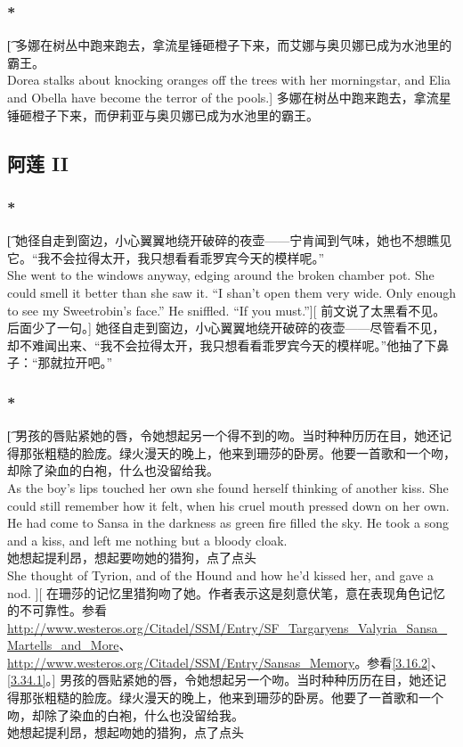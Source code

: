 \documentclass[12pt,a4paper]{article}
\begin{document}
\subsubsection{\color{red}*}\t[
	多娜在树丛中跑来跑去，拿流星锤砸橙子下来，而艾娜与奥贝娜已成为水池里的霸王。\\
	Dorea stalks about knocking oranges off the trees with her morningstar, and Elia and Obella have become the terror of the pools.]
	多娜在树丛中跑来跑去，拿流星锤砸橙子下来，而伊莉亚与奥贝娜已成为水池里的霸王。
	
\subsection{阿莲 II}
\subsubsection{\color{red}*}\t[
	她径自走到窗边，小心翼翼地绕开破碎的夜壶——宁肯闻到气味，她也不想瞧见它。“我不会拉得太开，我只想看看乖罗宾今天的模样呢。”\\
	She went to the windows anyway, edging around the broken chamber pot. She could smell it better than she saw it. “I shan't open them very wide. Only enough to see my Sweetrobin's face.” He sniffled. “If you must.”][
	前文说了太黑看不见。后面少了一句。]
	她径自走到窗边，小心翼翼地绕开破碎的夜壶——尽管看不见，却不难闻出来、“我不会拉得太开，我只想看看乖罗宾今天的模样呢。”他抽了下鼻子：“那就拉开吧。”

\subsubsection{\color{red}*}\label{4.41.2}\t[
	男孩的唇贴紧她的唇，令她想起另一个得不到的吻。当时种种历历在目，她还记得那张粗糙的脸庞。绿火漫天的晚上，他来到珊莎的卧房。他要一首歌和一个吻，却除了染血的白袍，什么也没留给我。\\
		As the boy's lips touched her own she found herself thinking of another kiss. She could still remember how it felt, when his cruel mouth pressed down on her own. He had come to Sansa in the darkness as green fire filled the sky. He took a song and a kiss, and left me nothing but a bloody cloak. \\
		她想起提利昂，想起要吻她的猎狗，点了点头\\
		She thought of Tyrion, and of the Hound and how he'd kissed her, and gave a nod. ][
	在珊莎的记忆里猎狗吻了她。作者表示这是刻意伏笔，意在表现角色记忆的不可靠性。参看\url{http://www.westeros.org/Citadel/SSM/Entry/SF_Targaryens_Valyria_Sansa_Martells_and_More}、\url{http://www.westeros.org/Citadel/SSM/Entry/Sansas_Memory}。参看\ref{3.16.2}、\ref{3.34.1}。]
	男孩的唇贴紧她的唇，令她想起另一个吻。当时种种历历在目，她还记得那张粗糙的脸庞。绿火漫天的晚上，他来到珊莎的卧房。他要了一首歌和一个吻，却除了染血的白袍，什么也没留给我。\\
	她想起提利昂，想起吻她的猎狗，点了点头
\end{document}
